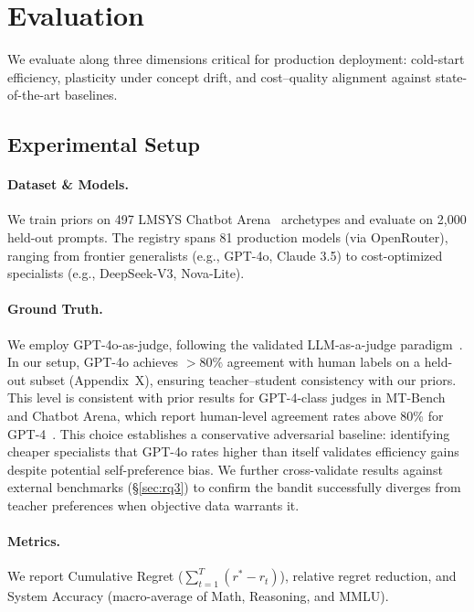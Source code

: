 
\section{Evaluation}
\label{sec:evaluation}

We evaluate \ours{} along three dimensions critical for production deployment: cold-start efficiency, plasticity under concept drift, and cost--quality alignment against state-of-the-art baselines.

\subsection{Experimental Setup}
\label{sec:experiments}

\paragraph{Dataset \& Models.} We train priors on 497 LMSYS Chatbot Arena~\cite{zheng2023judging} archetypes and evaluate on 2,000 held-out prompts. The registry spans 81 production models (via OpenRouter), ranging from frontier generalists (e.g., GPT-4o, Claude 3.5) to cost-optimized specialists (e.g., DeepSeek-V3, Nova-Lite).

\paragraph{Ground Truth.} We employ GPT-4o-as-judge, following the validated LLM-as-a-judge paradigm~\cite{zheng2023judging}. In our setup, GPT-4o achieves $>80\%$ agreement with human labels on a held-out subset (Appendix~X), ensuring teacher--student consistency with our priors. This level is consistent with prior results for GPT-4-class judges in MT-Bench and Chatbot Arena, which report human-level agreement rates above 80\% for GPT-4~\cite{zheng2023judging}. This choice establishes a conservative adversarial baseline: identifying cheaper specialists that GPT-4o rates higher than itself validates efficiency gains despite potential self-preference bias. We further cross-validate results against external benchmarks (\S\ref{sec:rq3}) to confirm the bandit successfully diverges from teacher preferences when objective data warrants it.

\paragraph{Metrics.} We report Cumulative Regret ($\sum_{t=1}^T (r^* - r_t)$), relative regret reduction, and System Accuracy (macro-average of Math, Reasoning, and MMLU).

